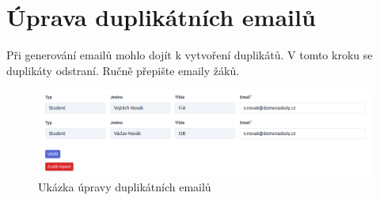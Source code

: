 \section{Úprava duplikátních emailů}
Při generování emailů mohlo dojít k vytvoření duplikátů. V tomto kroku se duplikáty odstraní. Ručně přepište emaily žáků.

\begin{figure}[H]
    \centering
    \includegraphics[width=1\linewidth]{Figures/deduplikace.png}
    \caption{Ukázka úpravy duplikátních emailů}
    \label{fig:deduplikace}
\end{figure}


% 
